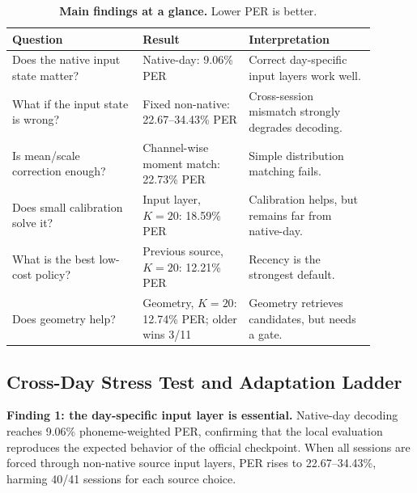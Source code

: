 \documentclass{article}
\begin{document}
\begin{table}[t]
\centering
\caption{\textbf{Main findings at a glance.} Lower PER is better.}
\scriptsize
\setlength{\tabcolsep}{3pt}
\begin{tabular}{@{}p{0.32\linewidth}p{0.26\linewidth}p{0.31\linewidth}@{}}
\toprule
Question & Result & Interpretation \\
\midrule
Does the native input state matter? & Native-day: 9.06\% PER & Correct day-specific input layers work well. \\
What if the input state is wrong? & Fixed non-native: 22.67--34.43\% PER & Cross-session mismatch strongly degrades decoding. \\
Is mean/scale correction enough? & Channel-wise moment match: 22.73\% PER & Simple distribution matching fails. \\
Does small calibration solve it? & Input layer, $K=20$: 18.59\% PER & Calibration helps, but remains far from native-day. \\
What is the best low-cost policy? & Previous source, $K=20$: 12.21\% PER & Recency is the strongest default. \\
Does geometry help? & Geometry, $K=20$: 12.74\% PER; older wins 3/11 & Geometry retrieves candidates, but needs a gate. \\
\bottomrule
\end{tabular}
\label{tab:main-findings}
\end{table}

\subsection{Cross-Day Stress Test and Adaptation Ladder}
\textbf{Finding 1: the day-specific input layer is essential.}
Native-day decoding reaches 9.06\% phoneme-weighted PER, confirming that the local evaluation reproduces the expected behavior of the official checkpoint. When all sessions are forced through non-native source input layers, PER rises to 22.67--34.43\%, harming 40/41 sessions for each source choice.
\end{document}
